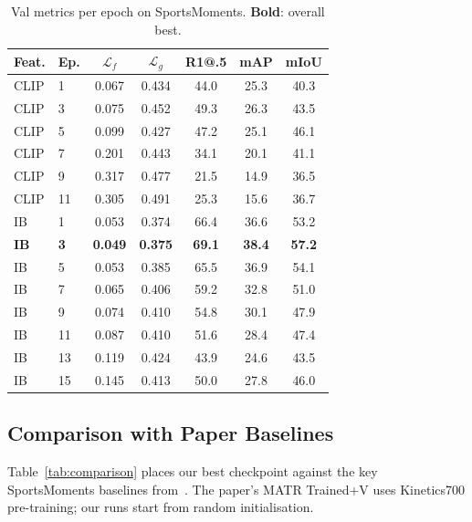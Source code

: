 \documentclass[10pt,twocolumn]{article}
\begin{document}
\begin{table}[h]
  \centering
  \small
  \caption{Val metrics per epoch on SportsMoments. \textbf{Bold}: overall best.}
  \label{tab:training}
  \setlength{\tabcolsep}{3.5pt}
  \begin{tabular}{llccccc}
    \toprule
    Feat. & Ep. & $\mathcal{L}_f$ & $\mathcal{L}_g$ & R1@.5 & mAP & mIoU \\
    \midrule
    CLIP & 1  & 0.067 & 0.434 & 44.0 & 25.3 & 40.3 \\
    CLIP & 3  & 0.075 & 0.452 & 49.3 & 26.3 & 43.5 \\
    CLIP & 5  & 0.099 & 0.427 & 47.2 & 25.1 & 46.1 \\
    CLIP & 7  & 0.201 & 0.443 & 34.1 & 20.1 & 41.1 \\
    CLIP & 9  & 0.317 & 0.477 & 21.5 & 14.9 & 36.5 \\
    CLIP & 11 & 0.305 & 0.491 & 25.3 & 15.6 & 36.7 \\
    \midrule
    IB   & 1  & 0.053 & 0.374 & 66.4 & 36.6 & 53.2 \\
    \textbf{IB} & \textbf{3} & \textbf{0.049} & \textbf{0.375} & \textbf{69.1} & \textbf{38.4} & \textbf{57.2} \\
    IB   & 5  & 0.053 & 0.385 & 65.5 & 36.9 & 54.1 \\
    IB   & 7  & 0.065 & 0.406 & 59.2 & 32.8 & 51.0 \\
    IB   & 9  & 0.074 & 0.410 & 54.8 & 30.1 & 47.9 \\
    IB   & 11 & 0.087 & 0.410 & 51.6 & 28.4 & 47.4 \\
    IB   & 13 & 0.119 & 0.424 & 43.9 & 24.6 & 43.5 \\
    IB   & 15 & 0.145 & 0.413 & 50.0 & 27.8 & 46.0 \\
    \bottomrule
  \end{tabular}
\end{table}

\subsection{Comparison with Paper Baselines}

Table~\ref{tab:comparison} places our best checkpoint against the key
SportsMoments baselines from~\cite{kumar2025matr}. The paper's MATR
Trained+V uses Kinetics700 pre-training; our runs start from random
initialisation.
\end{document}
